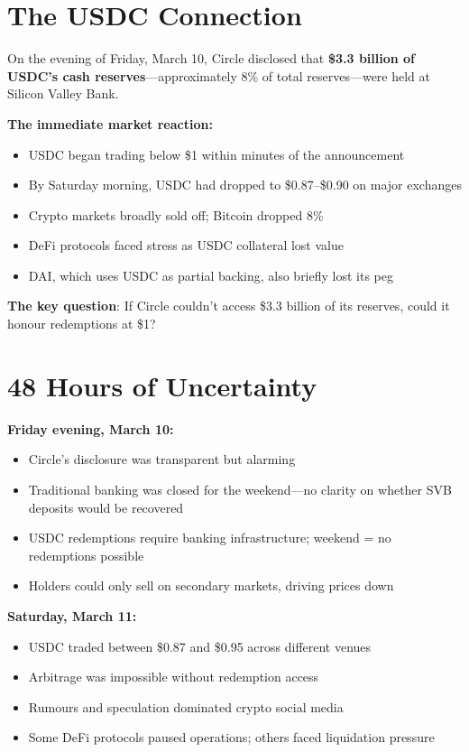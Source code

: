 \documentclass[11pt]{article}
\begin{document}
\section*{The USDC Connection}

On the evening of Friday, March 10, Circle disclosed that \textbf{\$3.3 billion of USDC's cash reserves}---approximately 8\% of total reserves---were held at Silicon Valley Bank.


\medskip
\noindent\textbf{The immediate market reaction:}
\begin{itemize}[leftmargin=*]
\item USDC began trading below \$1 within minutes of the announcement
\item By Saturday morning, USDC had dropped to \$0.87--\$0.90 on major exchanges
\item Crypto markets broadly sold off; Bitcoin dropped 8\%
\item DeFi protocols faced stress as USDC collateral lost value
\item DAI, which uses USDC as partial backing, also briefly lost its peg
\end{itemize}

\medskip
\noindent\textbf{The key question}: If Circle couldn't access \$3.3 billion of its reserves, could it honour redemptions at \$1?

\section*{48 Hours of Uncertainty}

\noindent\textbf{Friday evening, March 10:}
\begin{itemize}[leftmargin=*]
\item Circle's disclosure was transparent but alarming
\item Traditional banking was closed for the weekend---no clarity on whether SVB deposits would be recovered
\item USDC redemptions require banking infrastructure; weekend = no redemptions possible
\item Holders could only sell on secondary markets, driving prices down
\end{itemize}

\medskip
\noindent\textbf{Saturday, March 11:}
\begin{itemize}[leftmargin=*]
\item USDC traded between \$0.87 and \$0.95 across different venues
\item Arbitrage was impossible without redemption access
\item Rumours and speculation dominated crypto social media
\item Some DeFi protocols paused operations; others faced liquidation pressure
\end{itemize}
\end{document}
